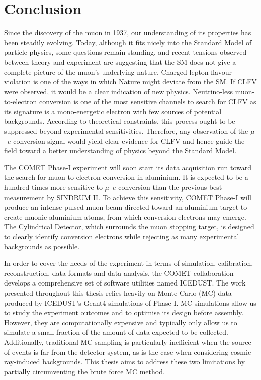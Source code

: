 \chapter{Conclusion}

Since the discovery of the muon in 1937, our understanding of its properties has
been steadily evolving. Today, although it fits nicely into the Standard Model
of particle physics, some questions remain standing, and recent tensions
observed between theory and experiment are suggesting that the SM does not give
a complete picture of the muon's underlying nature. Charged lepton flavour
violation is one of the ways in which Nature might deviate from the SM. If CLFV
were observed, it would be a clear indication of new physics. Neutrino-less
muon-to-electron conversion is one of the most sensitive channels to search for
CLFV as its signature is a mono-energetic electron with few sources of potential
backgrounds. According to theoretical constraints, this process ought to be
suppressed beyond experimental sensitivities. Therefore, any observation of the
$\mu$--$e$ conversion signal would yield clear evidence for CLFV and hence guide
the field toward a better understanding of physics beyond the Standard Model.

The COMET Phase\nobreakdash-I experiment will soon start its data acquisition
run toward the search for muon-to-electron conversion in aluminium. It is
expected to be a hundred times more sensitive to $\mu$--$e$ conversion than the
previous best measurement by SINDRUM II. To achieve this sensitivity, COMET
Phase\nobreakdash-I will produce an intense pulsed muon beam directed toward an
aluminium target to create muonic aluminium atoms, from which conversion
electrons may emerge. The Cylindrical Detector, which surrounds the muon
stopping target, is designed to clearly identify conversion electrons while
rejecting as many experimental backgrounds as possible. 

In order to cover the needs of the experiment in terms of simulation,
calibration, reconstruction, data formats and data analysis, the COMET
collaboration develops a comprehensive set of software utilities named ICEDUST.
The work presented throughout this thesis relies heavily on Monte Carlo (MC) data
produced by ICEDUST's {\sc Geant4} simulations of Phase\nobreakdash-I.
MC simulations allow us to study the experiment outcomes and to optimise its
design before assembly. However, they are computationally expensive and
typically only allow us to simulate a small fraction of the amount of data
expected to be collected. Additionally, traditional MC sampling is particularly
inefficient when the source of events is far from the detector system, as is the
case when considering cosmic ray-induced backgrounds. This thesis aims to
address these two limitations by partially circumventing the brute force MC
method.

